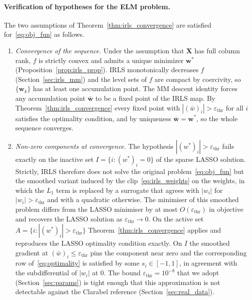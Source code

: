 \paragraph{Verification of hypotheses for the ELM problem.}
The two assumptions of Theorem~\ref{thm:irls_convergence} are satisfied for~\eqref{eq:obj_fun} as follows.
\begin{enumerate}
\item \emph{Convergence of the sequence.} Under the assumption that $\mathbf{X}$ has full column rank, $f$ is strictly convex and admits a unique minimizer $\mathbf{w}^*$ (Proposition~\ref{prop:irls_prop}). IRLS monotonically decreases $f$ (Section~\ref{sec:irls_mm}) and the level sets of $f$ are compact by coercivity, so $\{\mathbf{w}_k\}$ has at least one accumulation point. The MM descent identity forces any accumulation point $\bar{\mathbf{w}}$ to be a fixed point of the IRLS map. By Theorem~\ref{thm:irls_convergence} every fixed point with $|(\bar{w})_i| > \varepsilon_{\mathrm{thr}}$ for all $i$ satisfies the optimality condition, and by uniqueness $\bar{\mathbf{w}} = \mathbf{w}^*$, so the whole sequence converges.
\item \emph{Non-zero components at convergence.} The hypothesis $|(w^*)_i| > \varepsilon_{\mathrm{thr}}$ fails exactly on the inactive set $I = \{i : (w^*)_i = 0\}$ of the sparse LASSO solution. Strictly, IRLS therefore does not solve the original problem~\eqref{eq:obj_fun} but the smoothed variant induced by the clip~\eqref{eq:irls_weights} on the weights, in which the $L_1$ term is replaced by a surrogate that agrees with $|w_i|$ for $|w_i| > \varepsilon_{\mathrm{thr}}$ and with a quadratic otherwise. The minimiser of this smoothed problem differs from the LASSO minimiser by at most $O(\varepsilon_{\mathrm{thr}})$ in objective and recovers the LASSO solution as $\varepsilon_{\mathrm{thr}} \to 0$. On the active set $A = \{i : |(w^*)_i| > \varepsilon_{\mathrm{thr}}\}$ Theorem~\ref{thm:irls_convergence} applies and reproduces the LASSO optimality condition exactly. On $I$ the smoothed gradient at $(\bar{w})_i \le \varepsilon_{\mathrm{thr}}$ pins the component near zero and the corresponding row of~\eqref{eq:optimality} is satisfied by some $s_i \in [-1,1]$, in agreement with the subdifferential of $|w_i|$ at $0$. The bound $\varepsilon_{\mathrm{thr}} = 10^{-8}$ that we adopt (Section~\ref{sec:params}) is tight enough that this approximation is not detectable against the Clarabel reference (Section~\ref{sec:real_data}).
\end{enumerate}

